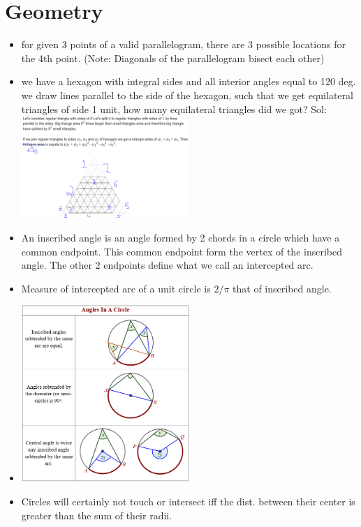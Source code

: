 \documentclass[8pt, a4paper, oneside, twocolumn]{extarticle}
\begin{document}
\section{Geometry}
\begin{itemize}
    \item for given 3 points of a valid parallelogram, there are 3 possible locations for the 4th point. (Note: Diagonals of the parallelogram bisect each other)
    \item we have a hexagon with integral sides and all interior angles equal to 120 deg. we draw lines parallel to the side of the hexagon, such that we get equilateral triangles of side 1 unit, how many equilateral triangles did we got? Sol: \includegraphics[width=0.5\textwidth,height=0.5\textheight,keepaspectratio]{triangle} 
    \item An inscribed angle is an angle formed by 2 chords in a circle which have a common endpoint. This common endpoint form the vertex of the inscribed angle. The other 2 endpoints define what we call an intercepted arc.
    \item Measure of intercepted arc of a unit circle is $2/\pi$ that of inscribed angle.
    \item \includegraphics[width=0.5\textwidth,height=0.5\textheight,keepaspectratio]{basiccircle} 
    \item Circles will certainly not touch or intersect iff the dist. between their center is greater than the sum of their radii.

\end{itemize}
\end{document}
